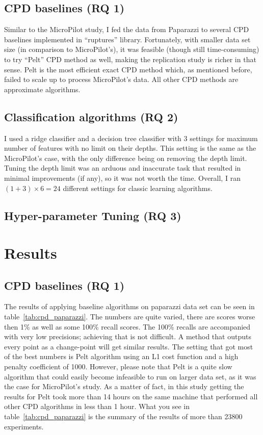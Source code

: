 \subsection{CPD baselines (RQ 1)}
Similar to the MicroPilot study, I fed the data from Paparazzi to several CPD baselines implemented in ``ruptures'' library.
Fortunately, with smaller data set size (in comparison to MicroPilot's), it was feasible (though still time-consuming) to try ``Pelt'' CPD method \cite{killick2012optimal} as well, making the replication study is richer in that sense. Pelt is the most efficient exact CPD method which, as mentioned before, failed to scale up to process MicroPilot's data. All other CPD methods are approximate algorithms.

\subsection{Classification algorithms (RQ 2)}
I used a ridge classifier and a decision tree classifier with 3 settings for maximum number of features with no limit on their depths. This setting is the same as the MicroPilot's case, with the only difference being on removing the depth limit. Tuning the depth limit was an arduous and inaccurate task that resulted in minimal improvements (if any), so it was not worth the time. Overall, I ran $(1+3)\times6=24$ different settings for classic learning algorithms. 

\subsection{Hyper-parameter Tuning (RQ 3)}

\section{Results}
\subsection{CPD baselines (RQ 1)}

The results of applying baseline algorithms on paparazzi data set can be seen in table~\ref{tab:cpd_paparazzi}.
The numbers are quite varied, there are scores worse then 1\% as well as some 100\% recall scores. The 100\% recalls are accompanied with very low precisions; achieving that is not difficult. A method that outputs every point as a change-point will get similar results. The setting that got most of the best numbers is Pelt algorithm using an L1 cost function and a high penalty coefficient of 1000. However, please note that Pelt is a quite slow algorithm that could easily become infeasible to run on larger data set, as it was the case for MicroPilot's study. As a matter of fact, in this study getting the results for Pelt took more than 14 hours on the same machine that performed all other CPD algorithms in less than 1 hour. What you see in table~\ref{tab:cpd_paparazzi} is the summary of the results of more than 23800 experiments. 

